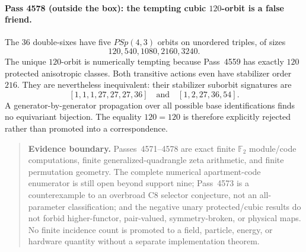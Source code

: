 \paragraph{Pass 4578 (outside the box): the tempting cubic $120$-orbit is a false friend.}
The $36$ double-sixes have five $PSp(4,3)$ orbits on unordered triples, of sizes
\[
 \boxed{120,540,1080,2160,3240.}
\]
The unique $120$-orbit is numerically tempting because Pass~4559 has exactly $120$ protected anisotropic classes.  Both transitive actions even have stabilizer order $216$.  They are nevertheless inequivalent: their stabilizer suborbit signatures are
\[
 [1,1,1,27,27,27,36]
 \quad\text{and}\quad
 [1,2,27,36,54].
\]
A generator-by-generator propagation over all possible base identifications finds no equivariant bijection.  The equality $120=120$ is therefore explicitly rejected rather than promoted into a correspondence.

\begin{quote}\small
\textbf{Evidence boundary.}
Passes~4571--4578 are exact finite $\mathbb F_2$ module/code computations,
finite generalized-quadrangle zeta arithmetic, and finite permutation geometry.
The complete numerical apartment-code enumerator is still open beyond support nine;
Pass~4573 is a counterexample to an overbroad C8 selector conjecture, not an all-parameter
classification; and the negative unary protected/cubic results do not forbid higher-functor,
pair-valued, symmetry-broken, or physical maps.  No finite incidence count is promoted to
a field, particle, energy, or hardware quantity without a separate implementation theorem.
\end{quote}
